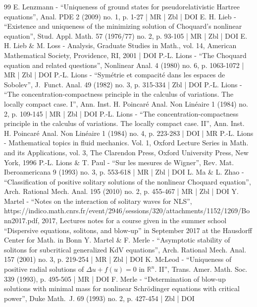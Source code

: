 \begin{thebibliography}{99}
E. Lenzmann - “Uniqueness of ground states for pseudorelativistic Hartree equations”, Anal. PDE 2 (2009) no. 1, p. 1-27 | MR | Zbl | DOI
E. H. Lieb - “Existence and uniqueness of the minimizing solution of Choquard’s nonlinear equation”, Stud. Appl. Math. 57 (1976/77) no. 2, p. 93-105 | MR | Zbl | DOI
E. H. Lieb \& M. Loss - Analysis, Graduate Studies in Math., vol. 14, American Mathematical Society, Providence, RI, 2001 | DOI
P.-L. Lions - “The Choquard equation and related questions”, Nonlinear Anal. 4 (1980) no. 6, p. 1063-1072 | MR | Zbl | DOI
P.-L. Lions - “Symétrie et compacité dans les espaces de Sobolev”, J. Funct. Anal. 49 (1982) no. 3, p. 315-334 | Zbl | DOI
P.-L. Lions - “The concentration-compactness principle in the calculus of variations. The locally compact case. I”, Ann. Inst. H. Poincaré Anal. Non Linéaire 1 (1984) no. 2, p. 109-145 | MR | Zbl | DOI
P.-L. Lions - “The concentration-compactness principle in the calculus of variations. The locally compact case. II”, Ann. Inst. H. Poincaré Anal. Non Linéaire 1 (1984) no. 4, p. 223-283 | DOI | MR
P.-L. Lions - Mathematical topics in fluid mechanics. Vol. 1, Oxford Lecture Series in Math. and its Applications, vol. 3, The Clarendon Press, Oxford University Press, New York, 1996
P.-L. Lions \& T. Paul - “Sur les mesures de Wigner”, Rev. Mat. Iberoamericana 9 (1993) no. 3, p. 553-618 | MR | Zbl | DOI
L. Ma \& L. Zhao - “Classification of positive solitary solutions of the nonlinear Choquard equation”, Arch. Rational Mech. Anal. 195 (2010) no. 2, p. 455-467 | MR | Zbl | DOI
Y. Martel - “Notes on the interaction of solitary waves for NLS”, https://indico.math.cnrs.fr/event/2946/sessions/320/attachments/1152/1269/Bonn2017.pdf, 2017, Lectures notes for a course given in the summer school “Dispersive equations, solitons, and blow-up” in September 2017 at the Hausdorff Center for Math. in Bonn
Y. Martel \& F. Merle - “Asymptotic stability of solitons for subcritical generalized KdV equations”, Arch. Rational Mech. Anal. 157 (2001) no. 3, p. 219-254 | MR | Zbl | DOI
K. McLeod - “Uniqueness of positive radial solutions of ${\Delta u+f(u)=0}$ in $\mathbb{R}^ n$. II”, Trans. Amer. Math. Soc. 339 (1993), p. 495-505 | MR | DOI
F. Merle - “Determination of blow-up solutions with minimal mass for nonlinear Schrödinger equations with critical power”, Duke Math. J. 69 (1993) no. 2, p. 427-454 | Zbl | DOI

\end{thebibliography}
